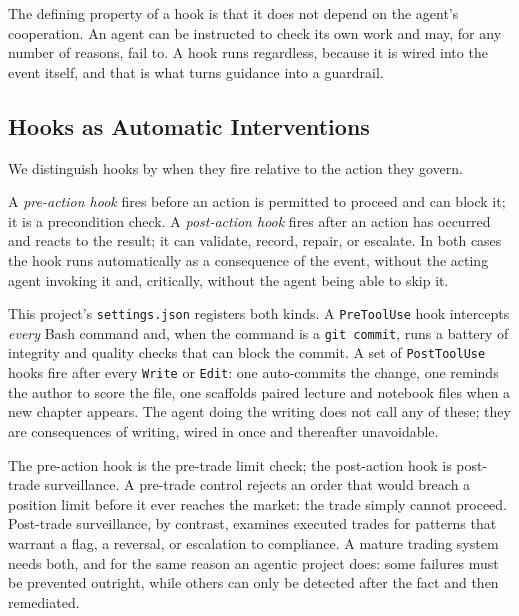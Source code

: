 The defining property of a hook is that it does not depend on the agent's cooperation. An agent can be instructed to check its own work and may, for any number of reasons, fail to. A hook runs regardless, because it is wired into the event itself, and that is what turns guidance into a guardrail.

\subsection{Hooks as Automatic Interventions}\label{subsec:hooks-automatic}

We distinguish hooks by when they fire relative to the action they govern.

\begin{definition}\label{def:hook-types}
A \emph{pre-action hook} fires before an action is permitted to proceed and can block it; it is a precondition check. A \emph{post-action hook} fires after an action has occurred and reacts to the result; it can validate, record, repair, or escalate. In both cases the hook runs automatically as a consequence of the event, without the acting agent invoking it and, critically, without the agent being able to skip it.
\end{definition}

This project's \texttt{settings.json} registers both kinds. A \texttt{PreToolUse} hook intercepts \emph{every} Bash command and, when the command is a \texttt{git commit}, runs a battery of integrity and quality checks that can block the commit. A set of \texttt{PostToolUse} hooks fire after every \texttt{Write} or \texttt{Edit}: one auto-commits the change, one reminds the author to score the file, one scaffolds paired lecture and notebook files when a new chapter appears. The agent doing the writing does not call any of these; they are consequences of writing, wired in once and thereafter unavoidable.

\begin{context}
The pre-action hook is the pre-trade limit check; the post-action hook is post-trade surveillance. A pre-trade control rejects an order that would breach a position limit before it ever reaches the market: the trade simply cannot proceed. Post-trade surveillance, by contrast, examines executed trades for patterns that warrant a flag, a reversal, or escalation to compliance. A mature trading system needs both, and for the same reason an agentic project does: some failures must be prevented outright, while others can only be detected after the fact and then remediated.
\end{context}

